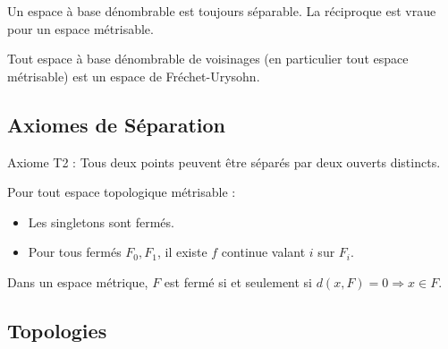 \documentclass{cours}
\begin{document}
\begin{theorem}
    Un espace à base dénombrable est toujours séparable. La réciproque est vraue pour un espace métrisable.
\end{theorem}

\begin{theorem}
    Tout espace à base dénombrable de voisinages (en particulier tout espace métrisable) est un espace de Fréchet-Urysohn.
\end{theorem}

\subsection{Axiomes de Séparation}
\begin{definition}
    Axiome T2 : Tous deux points peuvent être séparés par deux ouverts distincts.
\end{definition}

\begin{theorem}
    Pour tout espace topologique métrisable : 
    \begin{itemize}
        \item Les singletons sont fermés.
        \item Pour tous fermés $F_{0}, F_{1}$, il existe $f$ continue valant $i$ sur $F_{i}$.
    \end{itemize}
\end{theorem}

\begin{lemma}
    Dans un espace métrique, $F$ est fermé si et seulement si $d(x, F) = 0 \Rightarrow x \in F$.
\end{lemma}

\subsection{Topologies}
\end{document}

